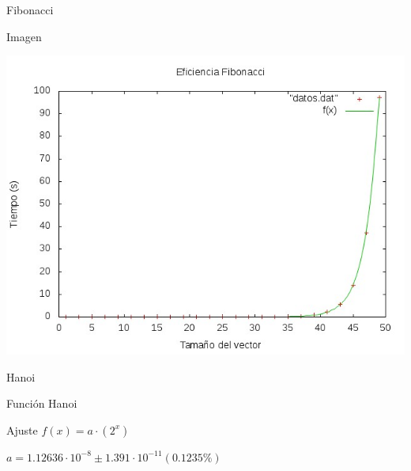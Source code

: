 \documentclass[compress]{beamer}
\begin{document}
\begin{frame}{Fibonacci}
	\begin{alertblock}{Imagen}
	\begin{center}
	\includegraphics[scale=0.55]{../Graficas/Fibonacci/fibonacciO0_ruben.jpeg}
	\end{center}
	\end{alertblock}
\end{frame}



\begin{frame}{Hanoi}
	\begin{block}{Función}
		Hanoi
	\end{block}
	
	\begin{block}{Ajuste}
	$f(x) = a\cdot(2^x) $
	
	$a               = 1.12636\cdot 10^{-8}      \pm 1.391\cdot 10^{-11}    (0.1235\%)$
	\end{block}
\end{frame}
\end{document}
